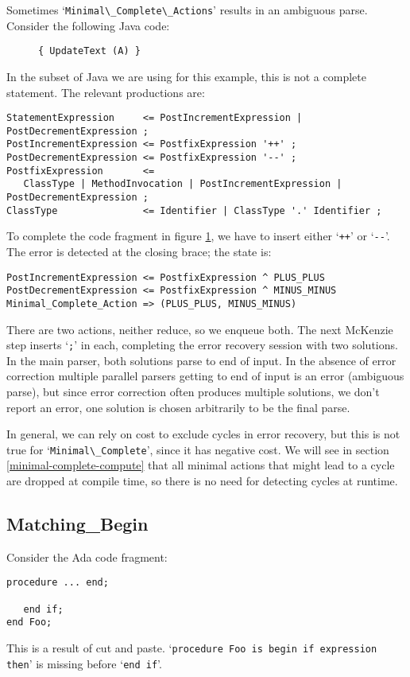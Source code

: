 \documentclass{article}
\newcommand{\code}[1]{`\lstinline|#1|'}
\begin{document}
Sometimes \code{Minimal\_Complete\_Actions} results in an ambiguous
parse. Consider the following Java code:
\begin{figure}[H]
  \small{
\begin{lstlisting}
{ UpdateText (A) }
\end{lstlisting}
}
\caption{}
\label{ex:minimal_complete_ambiguous}
\end{figure}
In the subset of Java we are using for this example, this is not a
complete statement. The relevant productions are:
\begin{verbatim}
StatementExpression     <= PostIncrementExpression | PostDecrementExpression ;
PostIncrementExpression <= PostfixExpression '++' ;
PostDecrementExpression <= PostfixExpression '--' ;
PostfixExpression       <=
   ClassType | MethodInvocation | PostIncrementExpression | PostDecrementExpression ;
ClassType               <= Identifier | ClassType '.' Identifier ;
\end{verbatim}
To complete the code fragment in figure
\ref{ex:minimal_complete_ambiguous}, we have to insert either
\code{++} or \code{--}. The error is detected at the closing brace;
the state is:
\begin{verbatim}
PostIncrementExpression <= PostfixExpression ^ PLUS_PLUS
PostDecrementExpression <= PostfixExpression ^ MINUS_MINUS
Minimal_Complete_Action => (PLUS_PLUS, MINUS_MINUS)
\end{verbatim}
There are two actions, neither reduce, so we enqueue both. The next
McKenzie step inserts \code{;} in each, completing the error recovery
session with two solutions. In the main parser, both solutions parse
to end of input. In the absence of error correction multiple parallel
parsers getting to end of input is an error (ambiguous parse), but
since error correction often produces multiple solutions, we don't
report an error, one solution is chosen arbitrarily to be the final
parse.

In general, we can rely on cost to exclude cycles in error recovery,
but this is not true for \code{Minimal\_Complete}, since it has
negative cost. We will see in section \ref{minimal-complete-compute}
that all minimal actions that might lead to a cycle are dropped at
compile time, so there is no need for detecting cycles at runtime.

\subsection{Matching\_Begin}
Consider the Ada code fragment:
\begin{lstlisting}
procedure ... end;

   end if;
end Foo;
\end{lstlisting}
This is a result of cut and paste.
\code{procedure Foo is begin if expression then} is missing before
\code{end if}.
\end{document}
